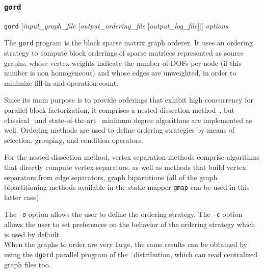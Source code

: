 \subsubsection{\texttt{gord}}

\begin{itemize}
\progsyn
\texttt{gord} [{\it input\_graph\_file} [{\it output\_ordering\_file} [{\it output\_log\_file}]]] {\it options}

\progdes
The \texttt{gord} program is the block sparse matrix graph orderer. It uses an
ordering strategy to compute block orderings of sparse matrices
represented as source graphs, whose vertex weights indicate the number
of DOFs per node (if this number is non homogeneous) and whose edges
are unweighted, in order to minimize fill-in and operation count.

Since its main purpose is to provide orderings that exhibit high
concurrency for parallel block factorization, it comprises a nested
dissection method~\cite{geli81}, but classical~\cite{liu-85} and
state-of-the-art~\cite{amdadu96,peroam99} minimum degree algorithms
are implemented as well.
Ordering methods are used to define ordering strategies by means of
selection, grouping, and condition operators.

For the nested dissection method, vertex separation methods comprise
algorithms that directly compute vertex separators, as well as methods
that build vertex separators from edge separators, \ie graph
bipartitions (all of the graph bipartitioning methods available in the
static mapper \texttt{gmap} can be used in this latter case).

The \texttt{-o} option allows the user to define the ordering
strategy. The \texttt{-c} option allows the user to set preferences on
the behavior of the ordering strategy which is used by default.
\\

When the graphs to order are very large, the same results can
be obtained by using the \texttt{dgord} parallel program of the
\ptscotch\ distribution, which can read centralized graph
files too.


\end{itemize}
